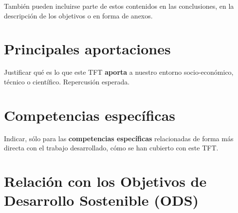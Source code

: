 \documentclass[oneside,12pt]{book}
\begin{document}
También pueden incluirse parte de estos contenidos en las conclusiones, en la descripción de los objetivos o en forma de anexos.

\section{Principales aportaciones}

Justificar qué es lo que este TFT \textbf{aporta} a nuestro entorno socio-económico, técnico o científico. Repercusión esperada.

\section{Competencias específicas}

Indicar, sólo para las \textbf{competencias específicas} relacionadas de forma más directa con el trabajo desarrollado, cómo se han cubierto con este TFT.

\section{Relación con los Objetivos de Desarrollo Sostenible (ODS)}
\end{document}
